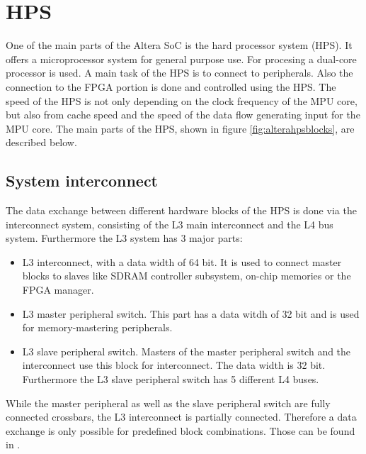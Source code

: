 \section{HPS}
One of the main parts of the Altera SoC is the hard processor system (HPS). It offers a microprocessor system for general purpose use. For procesing a dual-core processor is used. A main task of the HPS is to connect to peripherals. Also the connection to the FPGA portion is done and controlled using the HPS. The speed of the HPS is not only depending on the clock frequency of the MPU core, but also from cache speed and the speed of the data flow generating input for the MPU core. The main parts of the HPS, shown in figure \ref{fig:alterahpsblocks}, are described below.
\subsection{System interconnect}
The data exchange between different hardware blocks of the HPS is done via the interconnect system, consisting of the L3 main interconnect and the L4 bus system. Furthermore the L3 system has 3 major parts:
\begin{itemize}
\item L3 interconnect, with a data width of 64 bit. It is used to connect master blocks to slaves like SDRAM controller subsystem, on-chip memories or the FPGA manager.
\item L3 master peripheral switch. This part has a data witdh of 32 bit and is used for memory-mastering peripherals.
\item L3 slave peripheral switch. Masters of the master peripheral switch and the interconnect use this block for interconnect. The data width is 32 bit. Furthermore the L3 slave peripheral switch has 5 different L4 buses.
\end{itemize}
While the master peripheral as well as the slave peripheral switch are fully connected crossbars, the L3 interconnect is partially connected. Therefore a data exchange is only possible for predefined block combinations. Those can be found in \cite[chapter 7]{AlteraHPS15}.
